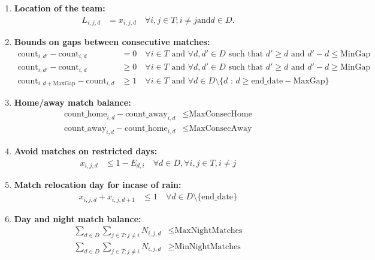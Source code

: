 \documentclass[a4paper, 12pt]{article}
\begin{document}
\begin{enumerate}
    \item \textbf{Location of the team:}
    \begin{align*}
        L_{i,j,d} &= x_{i,j,d} \quad \forall i,j \in T; i \neq j \text{and} d \in D.
    \end{align*}

    \item \textbf{Bounds on gaps between consecutive matches:}
    \begin{align*}
        \text{count}_{i,d'} - \text{count}_{i,d} &= 0 \quad \forall i \in T \text{ and } \forall d, d' \in D \text{ such that $d' \geq d$ and $d' - d \leq \text{MinGap}$} \\
        \text{count}_{i,d'} - \text{count}_{i,d} &\geq 0 \quad \forall i \in T \text{ and } \forall d, d' \in D \text{ such that $d' \geq d$ and $d' - d \geq \text{MinGap}$} \\
        \text{count}_{i,d+\text{MaxGap}} - \text{count}_{i,d} &\geq 1 \quad \forall i \in T \text{ and } \forall d \in D \setminus \{d \text{ : } d \geq \text{end\_date} - \text{MaxGap} \} 
    \end{align*}

    \item \textbf{Home/away match balance:}
    \begin{align*}
        \text{count\_home}_{i,d} - \text{count\_away}_{i,d} &\leq \text{MaxConsecHome} \\
        \text{count\_away}_{i,d} - \text{count\_home}_{i,d} &\leq \text{MaxConsecAway}
    \end{align*}

    \item \textbf{Avoid matches on restricted days:}
    \begin{align*}
        x_{i,j,d} &\leq 1 - E_{d,i} \quad \forall d \in D, \forall i,j \in T, i \neq j
    \end{align*}

    \item \textbf{Match relocation day for incase of rain:}
    \begin{align*}
        x_{i,j,d} + x_{i,j,d+1} &\leq 1 \quad \forall d \in D \setminus \{ \text{end\_date} \}
    \end{align*}

    \item \textbf{Day and night match balance:}
    \begin{align*}
        \sum_{d \in D} \sum_{j \in T : j \neq i} N_{i,j,d} &\leq \text{MaxNightMatches} \\
        \sum_{d \in D} \sum_{j \in T : j \neq i} N_{i,j,d} &\geq \text{MinNightMatches}
    \end{align*}
\end{enumerate}
\end{document}
